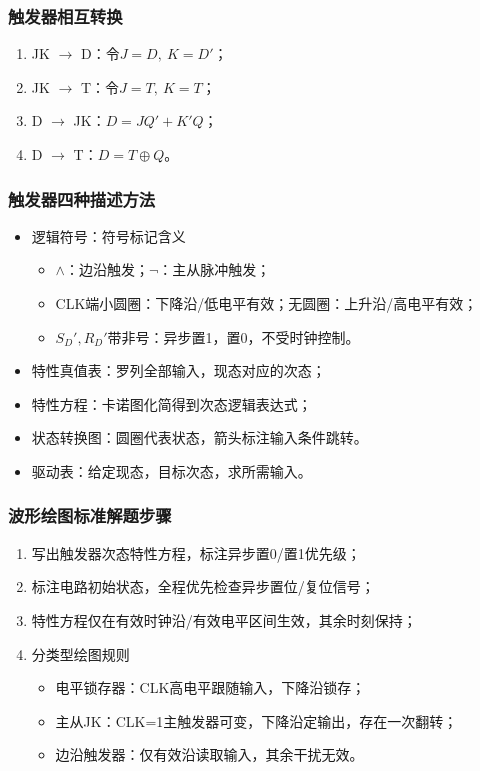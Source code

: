 \subsubsection{触发器相互转换}
\begin{enumerate}
    \item JK $\rightarrow$ D：令$J=D,\ K=D'$；
    \item JK $\rightarrow$ T：令$J=T,\ K=T$；
    \item D $\rightarrow$ JK：$D=JQ'+K'Q$；
    \item D $\rightarrow$ T：$D=T\oplus Q$。
\end{enumerate}

\subsubsection{触发器四种描述方法}
\begin{itemize}
    \item 逻辑符号：符号标记含义
    \begin{itemize}
        \item $\wedge$：边沿触发；$\neg$：主从脉冲触发；
        \item CLK端小圆圈：下降沿/低电平有效；无圆圈：上升沿/高电平有效；
        \item $S_D',R_D'$带非号：异步置1，置0，不受时钟控制。
    \end{itemize}
    \item 特性真值表：罗列全部输入，现态对应的次态；
    \item 特性方程：卡诺图化简得到次态逻辑表达式；
    \item 状态转换图：圆圈代表状态，箭头标注输入条件跳转。
    \item 驱动表：给定现态，目标次态，求所需输入。
\end{itemize}

\subsubsection{波形绘图标准解题步骤}
\begin{enumerate}
    \item 写出触发器次态特性方程，标注异步置0/置1优先级；
    \item 标注电路初始状态，全程优先检查异步置位/复位信号；
    \item 特性方程仅在有效时钟沿/有效电平区间生效，其余时刻保持；
    \item 分类型绘图规则
    \begin{itemize}
        \item 电平锁存器：CLK高电平跟随输入，下降沿锁存；
        \item 主从JK：CLK=1主触发器可变，下降沿定输出，存在一次翻转；
        \item 边沿触发器：仅有效沿读取输入，其余干扰无效。
    \end{itemize}
\end{enumerate}

